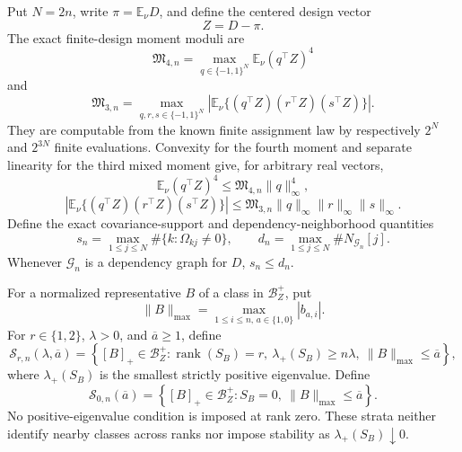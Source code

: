 Put \(N=2n\), write \(\pi=\mathbb E_\nu D\), and define the centered design vector
\[
Z=D-\pi.
\]
The exact finite-design moment moduli are
\[
\mathfrak M_{4,n}
=\max_{q\in\{-1,1\}^{N}}\mathbb E_\nu(q^{\top}Z)^4
\]
and
\[
\mathfrak M_{3,n}
=\max_{q,r,s\in\{-1,1\}^{N}}
\left|\mathbb E_\nu\{(q^{\top}Z)(r^{\top}Z)(s^{\top}Z)\}\right|.
\]
They are computable from the known finite assignment law by respectively \(2^N\) and \(2^{3N}\) finite evaluations.  Convexity for the fourth moment and separate linearity for the third mixed moment give, for arbitrary real vectors,
\[
\mathbb E_\nu(q^{\top}Z)^4
\le\mathfrak M_{4,n}\lVert q\rVert_\infty^4,
\]
\[
\left|\mathbb E_\nu\{(q^{\top}Z)(r^{\top}Z)(s^{\top}Z)\}\right|
\le\mathfrak M_{3,n}\lVert q\rVert_\infty
\lVert r\rVert_\infty\lVert s\rVert_\infty.
\]
Define the exact covariance-support and dependency-neighborhood quantities
\[
s_n=\max_{1\le j\le N}\#\{k:\Omega_{kj}\ne0\},
\qquad d_n=\max_{1\le j\le N}\#N_{\mathcal G_n}[j].
\]
Whenever \(\mathcal G_n\) is a dependency graph for \(D\), \(s_n\le d_n\).

For a normalized representative \(B\) of a class in \(\mathcal B_Z^+\), put
\[
\lVert B\rVert_{\max}
=\max_{1\le i\le n,\,a\in\{1,0\}}|b_{a,i}|.
\]
For \(r\in\{1,2\}\), \(\lambda>0\), and \(\overline a\ge1\), define
\[
\mathcal S_{r,n}(\lambda,\overline a)
=\left\{[B]_+\in\mathcal B_Z^+:
\operatorname{rank}(S_B)=r,\ 
\lambda_+(S_B)\ge n\lambda,\ 
\lVert B\rVert_{\max}\le\overline a\right\},
\]
where \(\lambda_+(S_B)\) is the smallest strictly positive eigenvalue.  Define
\[
\mathcal S_{0,n}(\overline a)
=\left\{[B]_+\in\mathcal B_Z^+:S_B=0,\ 
\lVert B\rVert_{\max}\le\overline a\right\}.
\]
No positive-eigenvalue condition is imposed at rank zero.  These strata neither identify nearby classes across ranks nor impose stability as \(\lambda_+(S_B)\downarrow0\).